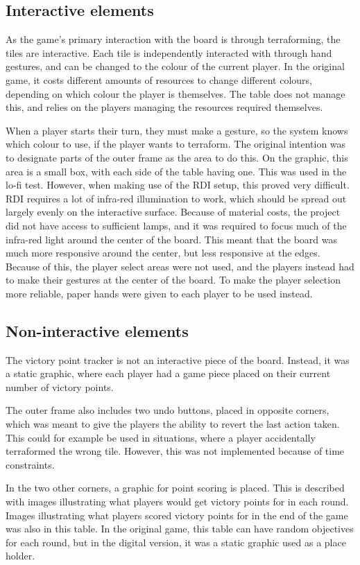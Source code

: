 \subsection{Interactive elements}
As the game's primary interaction with the board is through terraforming, the tiles are interactive. Each tile is independently interacted with through hand gestures, and can be changed to the colour of the current player. In the original game, it costs different amounts of resources to change different colours, depending on which colour the player is themselves. The table does not manage this, and relies on the players managing the resources required themselves.

When a player starts their turn, they must make a gesture, so the system knows which colour to use, if the player wants to terraform. The original intention was to designate parts of the outer frame as the area to do this. On the graphic, this area is a small box, with each side of the table having one. This was used in the lo-fi test. However, when making use of the RDI setup, this proved very difficult. RDI requires a lot of infra-red illumination to work, which should be spread out largely evenly on the interactive surface. Because of material costs, the project did not have access to sufficient lamps, and it was required to focus much of the infra-red light around the center of the board. This meant that the board was much more responsive around the center, but less responsive at the edges. Because of this, the player select areas were not used, and the players instead had to make their gestures at the center of the board. To make the player selection more reliable, paper hands were given to each player to be used instead. 

\subsection{Non-interactive elements}
The victory point tracker is not an interactive piece of the board. Instead, it was a static graphic, where each player had a game piece placed on their current number of victory points.

The outer frame also includes two undo buttons, placed in opposite corners, which was meant to give the players the ability to revert the last action taken. This could for example be used in situations, where a player accidentally terraformed the wrong tile. However, this was not implemented because of time constraints.

In the two other corners, a graphic for point scoring is placed. This is described with images illustrating what players would get victory points for in each round. Images illustrating what players scored victory points for in the end of the game was also in this table. In the original game, this table can have random objectives for each round, but in the digital version, it was a static graphic used as a place holder.